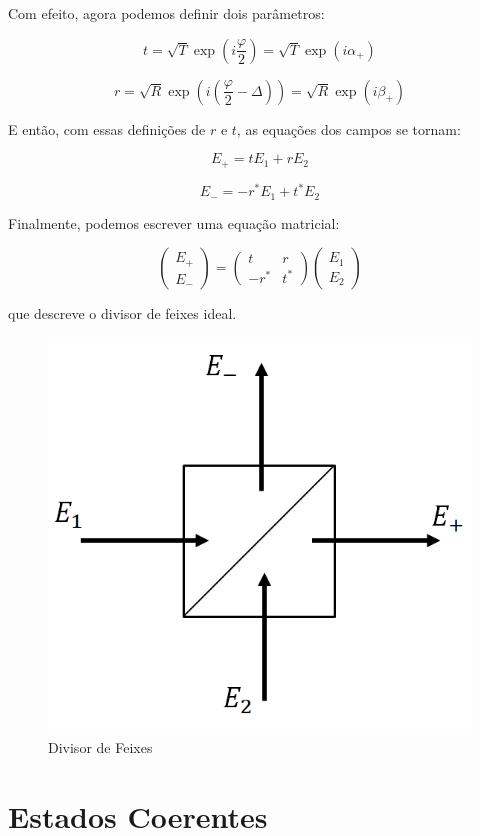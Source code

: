 \documentclass[12pt,a4paper]{report}
\begin{document}
Com efeito, agora podemos definir dois parâmetros:

\begin{equation*}
t=\sqrt{T}\exp(i\frac{\varphi}{2})=\sqrt{T}\exp(i\alpha_+)
\end{equation*}

\begin{equation*}
r=\sqrt{R}\exp(i(\frac{\varphi}{2}-\Delta))=\sqrt{R}\exp(i\beta_+)
\end{equation*}

E então, com essas definições de $r$ e $t$, as equações dos campos se tornam:

\begin{equation*}
    \boxed{E_+=t E_1+r E_2}
\end{equation*}

\begin{equation*}
    \boxed{E_-=-r^*E_1+t^*E_2}
\end{equation*}

Finalmente, podemos escrever uma equação matricial:

\begin{equation*}
    \begin{pmatrix}E_+\\E_-\end{pmatrix}=\begin{pmatrix}t & r\\-r^* & t^*\end{pmatrix} \begin{pmatrix}E_1\\E_2\end{pmatrix}
\end{equation*}

que descreve o divisor de feixes ideal.

\begin{figure}[H]
    \centering
    \includegraphics[width=0.3\linewidth]{beamsplitter.png}
    \caption{Divisor de Feixes}
    \label{beam.splitter}
\end{figure}
\pagebreak
\section{Estados Coerentes}\label{estados.coerentes.section}
\end{document}
